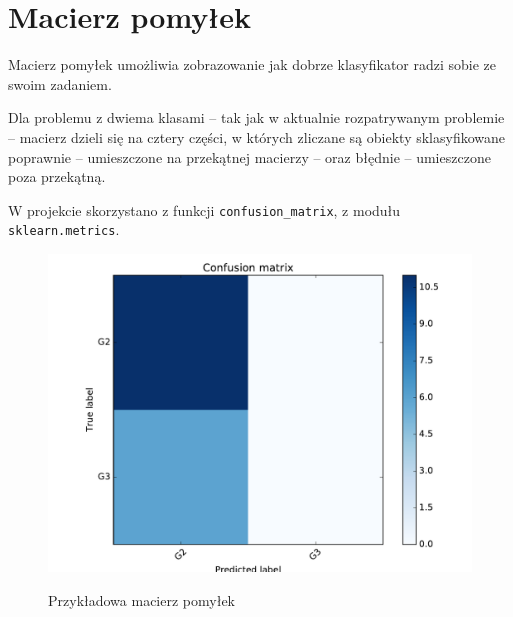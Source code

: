 \section{Macierz pomyłek}
Macierz pomyłek umożliwia zobrazowanie jak dobrze klasyfikator radzi sobie ze swoim zadaniem.

Dla problemu z dwiema klasami -- tak jak w aktualnie rozpatrywanym problemie -- macierz dzieli się na cztery części, w których zliczane są obiekty sklasyfikowane poprawnie -- umieszczone na przekątnej macierzy -- oraz błędnie -- umieszczone poza przekątną.

W projekcie skorzystano z funkcji \texttt{confusion\_matrix}, z modułu \texttt{sklearn.metrics}.
\begin{figure}[h!]
	\centering
	\includegraphics[width=\linewidth]{img/conf_matrix.pdf}
	\label{Rysunek}
	\caption{Przykładowa macierz pomyłek}
\end{figure}